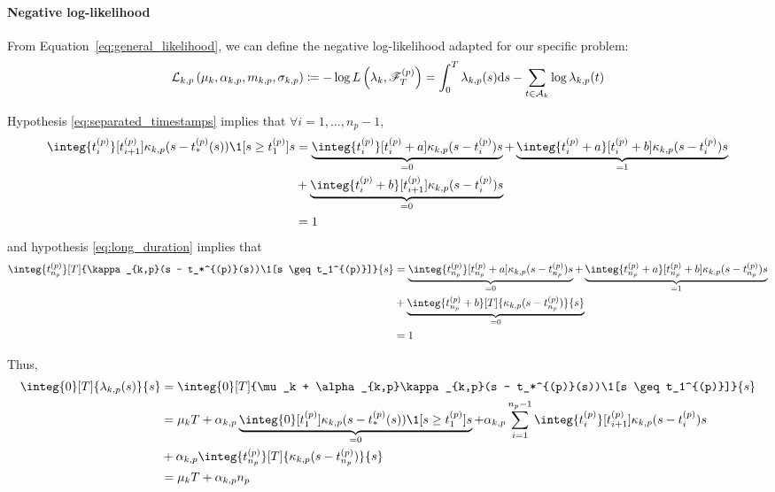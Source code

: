 \paragraph{Negative log-likelihood}
From Equation~\eqref{eq:general_likelihood}, we can define the negative log-likelihood adapted for our specific problem:
\begin{equation}
    \mathcal{L}_{k,p}\left( \mu_k, \alpha_{k,p}, m_{k,p}, \sigma_{k,p} \right) \coloneqq -\log L\left(\lambda_k, \mathscr{F}_{T}^{(p)}\right) = \int_{0}^{T} \lambda_{k,p}(s) \mathrm{d} s-\sum_{t\in\mathcal{A}_k} \log \lambda_{k,p}(t)
\end{equation}

Hypothesis \eqref{eq:separated_timestamps} implies that $\forall i=1,\dots,n_p - 1$,
\begin{align*}
    \integ{t_i^{(p)}}[t_{i+1}^{(p)}]{\kappa_{k,p}(s - t_*^{(p)}(s))\1[s \geq t_1^{(p)}]}{s} &= \underbrace{\integ{t_i^{(p)}}[t_i^{(p)}+a]{\kappa_{k,p}(s - t_i^{(p)})}{s}}_{=0} + \underbrace{\integ{t_i^{(p)}+a}[t_i^{(p)}+b]{\kappa_{k,p}(s - t_i^{(p)})}{s}}_{=1} \\
    &+ \underbrace{\integ{t_i^{(p)}+b}[t_{i+1}^{(p)}]{\kappa_{k,p}(s - t_i^{(p)})}{s}}_{=0} \\
    &= 1
\end{align*}
and hypothesis \eqref{eq:long_duration} implies that
\begin{align*}
    \integ{t_{n_p}^{(p)}}[T]{\kappa_{k,p}(s - t_*^{(p)}(s))\1[s \geq t_1^{(p)}]}{s} &= \underbrace{\integ{t_{n_p}^{(p)}}[t_{n_p}^{(p)} + a]{\kappa_{k,p}(s - t_{n_p}^{(p)})}{s}}_{=0} + \underbrace{\integ{t_{n_p}^{(p)}+a}[t_{n_p}^{(p)} + b]{\kappa_{k,p}(s - t_{n_p}^{(p)})}{s}}_{=1} \\
    &+ \underbrace{\integ{t_{n_p}^{(p)}+b}[T]{\kappa_{k,p}(s - t_{n_p}^{(p)})}{s}}_{=0}\\
    &= 1
\end{align*}

Thus,
\begin{align*}
    \integ{0}[T]{\lambda_{k,p}(s)}{s} &= \integ{0}[T]{\mu_k + \alpha_{k,p}\kappa_{k,p}(s - t_*^{(p)}(s))\1[s \geq t_1^{(p)}]}{s} \\
    &= \mu_k T + \alpha_{k,p}\underbrace{\integ{0}[t_1^{(p)}]{ \kappa_{k,p}(s - t_*^{(p)}(s))\1[s \geq t_1^{(p)}]}{s}}_{=0} + \alpha_{k,p}\sum_{i=1}^{n_p -1} \integ{t_i^{(p)}}[t_{i+1}^{(p)}]{\kappa_{k,p}(s - t_i^{(p)})}{s} \\
    &+ \alpha_{k,p}\integ{t_{n_p}^{(p)}}[T]{\kappa_{k,p}(s - t_{n_p}^{(p)})}{s} \\
    &= \mu_k T + \alpha_{k,p}n_p
\end{align*}

